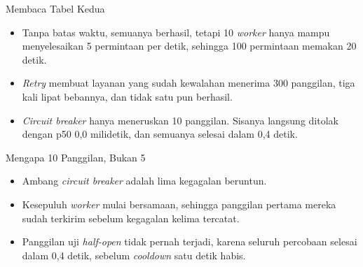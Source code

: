 \documentclass[aspectratio=169, table, 12pt]{beamer}
\begin{document}
\begin{frame}{{\Large Membaca Tabel Kedua}}
  \vspace{10pt}
  \begin{itemize}
    \item Tanpa batas waktu, semuanya berhasil, tetapi 10 \textit{worker} hanya mampu
          menyelesaikan 5 permintaan per detik, sehingga 100 permintaan
          memakan 20 detik.
    \item \textit{Retry} membuat layanan yang sudah kewalahan menerima 300
          panggilan, tiga kali lipat bebannya, dan tidak satu pun berhasil.
    \item \textit{Circuit breaker} hanya meneruskan 10 panggilan. Sisanya langsung
          ditolak dengan p50 0,0 milidetik, dan semuanya selesai dalam 0,4
          detik.
  \end{itemize}
\end{frame}

\begin{frame}{{\Large Mengapa 10 Panggilan, Bukan 5}}
  \vspace{10pt}
  \begin{itemize}
    \item Ambang \textit{circuit breaker} adalah lima kegagalan beruntun.
    \item Kesepuluh \textit{worker} mulai bersamaan, sehingga panggilan pertama mereka
          sudah terkirim sebelum kegagalan kelima tercatat.
    \item Panggilan uji \textit{half-open} tidak pernah terjadi, karena seluruh
          percobaan selesai dalam 0,4 detik, sebelum \textit{cooldown} satu detik
          habis.
  \end{itemize}
\end{frame}
\end{document}
